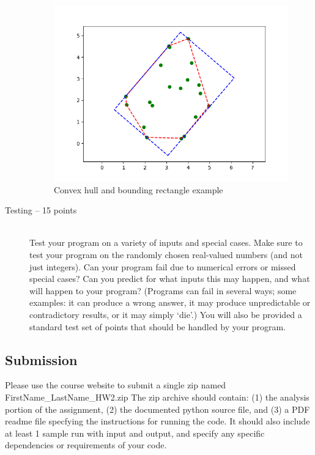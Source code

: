 \documentclass[]{article}
\begin{document}
\begin{description}
\begin{figure}[H]
\centering
\includegraphics[scale=0.45]{ch1.png}
\caption{Convex hull and bounding rectangle example}
\label{fig:display}
\end{figure}

\item [Testing -- 15 points] \hfil \\
Test your program on a variety of inputs and special cases. Make
sure to test your program on the randomly chosen real-valued
numbers (and not just integers). Can your program fail due to
numerical errors or missed special cases?  Can you predict for
what inputs this may  happen, and what will happen to your
program? (Programs can fail in several ways; some examples: it can
produce a wrong answer, it may produce unpredictable or
contradictory results, or it may simply `die'.) You will also be
provided a standard test set of points that should be handled by
your program.
\end{description}

\subsection*{Submission}
Please use the course website to submit a single  zip  named   FirstName\_LastName\_HW2.zip
The zip archive should contain:  (1) the analysis portion of the assignment,  
(2)  the documented python source file, and 
(3) a PDF readme file  specfying the instructions for running the code.  
It should also include at least 1 sample run with input and output,  and specify any specific dependencies or requirements of your code.  
\end{document}
